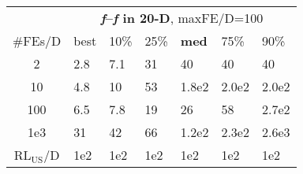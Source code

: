 \begin{tabular}{c|llllll}
 & \multicolumn{6}{|c}{\textbf{\textit{f}\raisebox{-0.35ex}{1}--\textit{f}\raisebox{-0.35ex}{24} in 20-D}, maxFE/D=100}\\
\#FEs/D & best & 10\% & 25\% & \textbf{med} & 75\% & 90\%\\
2 & \hspace*{1ex}2.8 & \hspace*{1ex}7.1 & 31 & 40 & 40 & 40\\
10 & \hspace*{1ex}4.8 & 10 & 53 & 1.8e2 & 2.0e2 & 2.0e2\\
100 & \hspace*{1ex}6.5 & \hspace*{1ex}7.8 & 19 & 26 & 58 & 2.7e2\\
1e3 & 31 & 42 & 66 & 1.2e2 & 2.3e2 & 2.6e3\\
$\text{RL}_{\text{US}}$/D & 1e2 & 1e2 & 1e2 & 1e2 & 1e2 & 1e2
\end{tabular}
